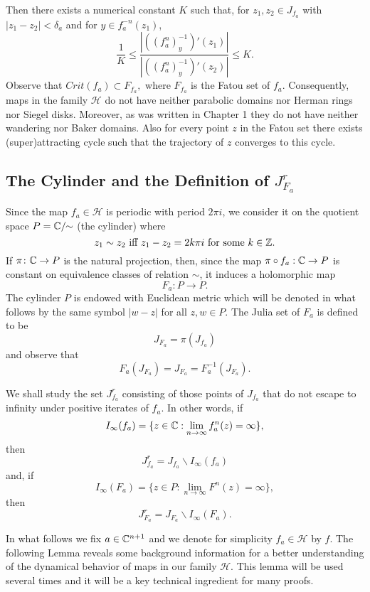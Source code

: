 Then there exists a numerical constant $K$ such that, for $z_1,z_2\in
J_{f_a}$ with $|z_1-z_2|<\delta_a$ and for $y\in f_a^{-n}(z_1)$,
\begin{equation}
  \label{eq:12}
  \frac{1}{K}\leq\frac
  {|((f^n_a)^{-1}_y)'(z_1)|}{|((f^n_a)^{-1}_ y)'(z_2)|}\leq K.
\end{equation}
Observe that $Crit(f_a)\subset F_{f_a},$ where $F_{f_a}$ is the Fatou set of
$f_a.$ Consequently, maps in the family $\mathcal{H}$ do not have neither
parabolic domains nor Herman rings nor Siegel disks.  Moreover, as was
written in Chapter 1 they do not have neither wandering nor Baker
domains. Also for every point $z$ in the Fatou set there exists
(super)attracting cycle such that the trajectory of $z$ converges to this
cycle.

\subsection{The Cylinder and the Definition of
  \texorpdfstring{$J^r_{F_a}$}{JrFa}}

Since the map $f_a \in \mathcal{H}$ is periodic with period $2\pi i$, we
consider it on the quotient space $P={\mathbb C}/\!\!\sim$ (the cylinder) where
\[
z_1 \sim z_2 \textrm { iff } z_1-z_2=2k\pi i \textrm { for some } k\in {\mathbb Z}.
\]
If $\pi \colon {\mathbb C} \rightarrow P$ is the natural projection, then, since
the map $\pi \circ f_a :{\mathbb C} \rightarrow P$ is constant on equivalence
classes of relation $\sim$, it induces a holomorphic map
\[
F_a :P\rightarrow P.
\]
The cylinder $P$ is endowed with Euclidean metric which will be denoted in
what follows by the same symbol $|w-z|$ for all $z,w \in P.$ The Julia set
of $F_a$ is defined to be
\[
J_{F_a}=\pi (J_{f_a})
\]
and observe that
\[
F_a(J_{F_a})=J_{F_a}=F_a^{-1}(J_{F_a}).
\]

We shall study the set $J^r_{f_a}$ consisting of those points of $J_{f_a}$
that do not escape to infinity under positive iterates of $f_a.$ In other
words, if
\[
I_\infty(f_a)=\{z\in {\mathbb C}: \lim_{n\to \infty}f_a^n(z)=\infty\},
\]
then
\[
J^r_{f_a}=J_{f_a}\backslash I_\infty(f_a) 
\]
and, if
\[
I_\infty(F_a)=\{z\in P: \lim_{n\to\infty}F^n(z)=\infty\},
\]
then 
\[
J^r_{F_a}=J_{F_a}\backslash I_\infty(F_a).
\]

In what follows we fix $a\in {\mathbb C}^{n+1}$ and we denote for simplicity $f_a
\in \mathcal{H}$ by $f$.  The following Lemma reveals some background
information for a better understanding of the dynamical behavior of maps in
our family $\mathcal{H}.$ This lemma will be used several times and it will
be a key technical ingredient for many proofs.

